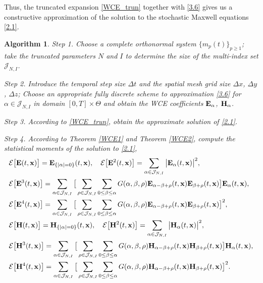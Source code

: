\documentclass[preprint,12pt]{article}
\newtheorem{algorithm}{\textbf{Algorithm}}
\numberwithin{figure}{section}
\numberwithin{table}{section}
\numberwithin{equation}{section}
\begin{document}
Thus, the truncated expansion \eqref{WCE_trun} together with \eqref{3.6} gives us a constructive approximation of the solution to the stochastic Maxwell equations \eqref{2.1}. 
\begin{algorithm}\label{algorithm 1}
Step 1. Choose a complete orthonormal system $\{m_p(t)\}_{p\geq1}$; take the truncated parameters $N$ and $I$ to determine the size of the multi-index set $\mathcal{J}_{N,I}$.

Step 2. Introduce the temporal step size $\Delta t$ and the spatial mesh grid size $\Delta x$, $\Delta y$, $\Delta z$; Choose an appropriate fully discrete scheme to approximation \eqref{3.6} for $\alpha\in\mathcal{J}_{N,I}$ in domain $[0,T]\times\Theta$ and obtain the WCE coefficients ${\bf E}_{\alpha}$, ${\bf H}_{\alpha}$.

Step 3. According to \eqref{WCE_trun}, obtain the approximate solution of \eqref{2.1}.

Step 4. According to Theorem \ref{WCE1} and Theorem \ref{WCE2}, compute the statistical moments of the solution to \eqref{2.1},
\begin{equation*}
	\begin{split}
	&\mathcal{E}\big[{\bf E}(t,{\bf x})\big]={\bf E}_{\{|\alpha|=0\}}(t,{\bf x}),\quad \mathcal{E}\big[{\bf E}^{2}(t,{\bf x})\big]=\sum_{\alpha\in\mathcal{J}_{N,I}}\big|{\bf E}_{\alpha}(t,{\bf x})\big|^{2},\\
    &\mathcal{E}\big[{\bf E}^{3}(t,{\bf x})\big]=\sum_{\alpha\in\mathcal{J}_{N,I}}\big[\sum_{\rho\in\mathcal{J}_{N,I}}\sum_{0\le \beta \le \alpha}G(\alpha,\beta,\rho){\bf E}_{\alpha-\beta+\rho}(t,{\bf x}){\bf E}_{\beta+\rho}(t,{\bf x})\big]{\bf E}_{\alpha}(t,{\bf x}),\\
    &\mathcal{E}\big[{\bf E}^{4}(t,{\bf x})\big]=\sum_{\alpha\in\mathcal{J}_{N,I}}\big[\sum_{\rho\in\mathcal{J}_{N,I}}\sum_{0\le \beta \le \alpha}G(\alpha,\beta,\rho){\bf E}_{\alpha-\beta+\rho}(t,{\bf x}){\bf E}_{\beta+\rho}(t,{\bf x})\big]^{2},\\    
	&\mathcal{E}\big[{\bf H}(t,{\bf x})\big]={\bf H}_{\{|\alpha|=0\}}(t,{\bf x}),\quad \mathcal{E}\big[{\bf H}^{2}(t,{\bf x})\big]=\sum_{\alpha\in\mathcal{J}_{N,I}}\big|{\bf H}_{\alpha}(t,{\bf x})\big|^{2},\\
    &\mathcal{E}\big[{\bf H}^{3}(t,{\bf x})\big]=\sum_{\alpha\in\mathcal{J}_{N,I}}\big[\sum_{\rho\in\mathcal{J}_{N,I}}\sum_{0\le \beta \le \alpha}G(\alpha,\beta,\rho){\bf H}_{\alpha-\beta+\rho}(t,{\bf x}){\bf H}_{\beta+\rho}(t,{\bf x})\big]{\bf H}_{\alpha}(t,{\bf x}),\\
    &\mathcal{E}\big[{\bf H}^{4}(t,{\bf x})\big]=\sum_{\alpha\in\mathcal{J}_{N,I}}\big[\sum_{\rho\in\mathcal{J}_{N,I}}\sum_{0\le \beta \le \alpha}G(\alpha,\beta,\rho){\bf H}_{\alpha-\beta+\rho}(t,{\bf x}){\bf H}_{\beta+\rho}(t,{\bf x})\big]^{2}.
	\end{split}
\end{equation*}
\end{algorithm}
\end{document}

